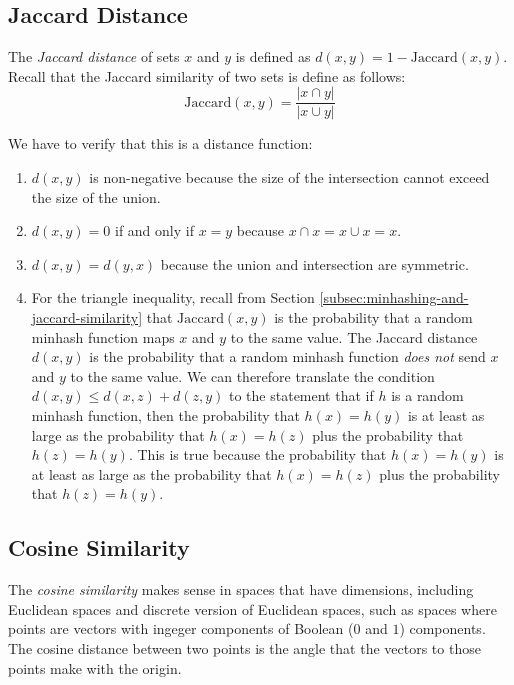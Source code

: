 \subsection{Jaccard Distance}\label{subsec:jaccard-distance}

The \textit{Jaccard distance} of sets $x$ and $y$ is defined as $d(x, y) = 1 - \text{Jaccard}(x, y)$. Recall that the Jaccard similarity of two sets is define as follows:
\begin{equation*}
    \text{Jaccard}(x, y) = \frac{\vert x \cap y \vert}{\vert x \cup y \vert}
\end{equation*}

We have to verify that this is a distance function:
\begin{enumerate}
    \item $d(x, y)$ is non-negative because the size of the intersection cannot exceed the size of the union.
    \item $d(x, y) = 0$ if and only if $x = y$ because $x \cap x = x \cup x = x$.
    \item $d(x, y) = d(y, x)$ because the union and intersection are symmetric.
    \item For the triangle inequality, recall from Section \ref{subsec:minhashing-and-jaccard-similarity} that $\text{Jaccard}(x, y)$ is the probability that a random minhash function maps $x$ and $y$ to the same value. The Jaccard distance $d(x, y)$ is the probability that a random minhash function \textit{does not} send $x$ and $y$ to the same value. We can therefore  translate the condition $d(x, y) \leq d(x, z) + d(z, y)$ to the statement that if $h$ is a random minhash function, then the probability that $h(x) = h(y)$ is at least as large as the probability that $h(x) = h(z)$ plus the probability that $h(z) = h(y)$. This is true because the probability that $h(x) = h(y)$ is at least as large as the probability that $h(x) = h(z)$ plus the probability that $h(z) = h(y)$.
\end{enumerate}

\subsection{Cosine Similarity}\label{subsec:cosine-similarity}

The \textit{cosine similarity} makes sense in spaces that have dimensions, including Euclidean spaces and discrete version of Euclidean spaces, such as spaces where points are vectors with ingeger components of Boolean ($0$ and $1$) components. The cosine distance between two points is the angle that the vectors to those points make with the origin. 

